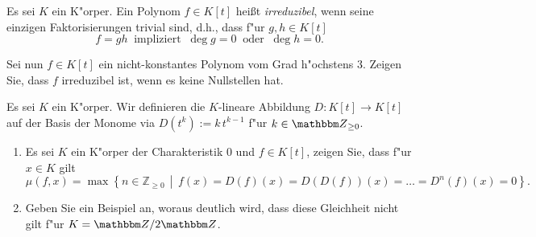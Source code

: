 \documentclass[a4,11pt]{article}
\begin{document}
\vspace*{-17mm}
{
\kopf
}


\begin{aufgabe}[4 Punkte]
Es sei $K$ ein K"orper. Ein Polynom $f\in K[t]$ heißt
\emph{irreduzibel}, wenn seine einzigen Faktorisierungen trivial sind,
d.h., dass f"ur $g,h \in K[t]$
\[
f = gh \ \text{ impliziert } \ \deg g = 0 \ \text{ oder } \ \deg h = 0.
\]


Sei nun $f\in K[t]$ ein nicht-konstantes Polynom
vom Grad h"ochstens $3$. Zeigen Sie, dass $f$ irreduzibel ist, wenn es
keine Nullstellen hat.

\end{aufgabe}

\begin{aufgabe}[4 Punkte]
Es sei $K$ ein K"orper. Wir definieren die $K$-lineare Abbildung $D
\colon K[t] \to K[t]$ auf der Basis der Monome via $D(t^k) := k\,t^{k-1}$
f"ur $k \in \Z_{\ge 0}$. 
  
\begin{enumerate}
\item Es sei $K$ ein K"orper der Charakteristik $0$ und $f \in K[t]$, zeigen Sie, dass f"ur $x\in K$ gilt
\[
\mu(f,x) = \max \left\{ n \in \mathbb{Z}_{\geq 0} \,\middle|\, f(x) = D(f)(x) =
D(D(f))(x) = \ldots = D^n(f)(x) = 0 \right\}.
\]
\item Geben Sie ein Beispiel an, woraus deutlich wird, dass diese Gleichheit nicht gilt f"ur $K = \Z/2\Z$.
\end{enumerate}

\end{aufgabe}
\end{document}

